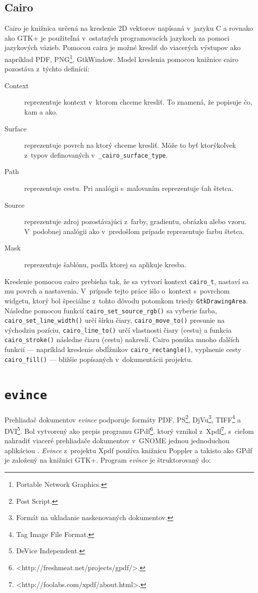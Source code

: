 \documentclass[12pt,oneside,final]{fithesis2}
\begin{document}
\section{Cairo}
Cairo je knižnica určená na kreslenie 2D vektorov napísaná v~jazyku C a rovnako ako GTK+ je použiteľná v~ostatných programovacích jazykoch za pomoci jazykových väzieb. Pomocou caira je možné kresliť do viacerých výstupov ako napríklad PDF, PNG\footnote{Portable Network Graphics.}, GtkWindow. Model kreslenia pomocou knižnice cairo pozostáva z~týchto definícií:
\begin{description}
\item[Context] reprezentuje kontext v~ktorom chceme kresliť. To znamená, že popisuje čo, kam a ako.
\item[Surface] reprezentuje povrch na ktorý chceme kresliť. Môže to byť ktorýkoľvek z~typov definovaných v~\texttt{\_cairo\_surface\_type}.
\item[Path] reprezentuje cestu. Pri analógii s~maľovaním reprezentuje ťah štetca.
\item[Source] reprezentuje zdroj pozostávajúci z~farby, gradientu, obrázku alebo vzoru. V~podobnej analógii ako v~predošlom prípade reprezentuje farbu štetca.
\item[Mask] reprezentuje šablónu, podľa ktorej sa aplikuje kresba.
\end{description}
Kreslenie pomocou cairo prebieha tak, že sa vytvorí kontext \texttt{cairo\_t}, nastaví sa mu povrch a nastavenia. V~prípade tejto práce išlo o~kontext s~povrchom widgetu, ktorý bol špeciálne z~tohto dôvodu potomkom triedy \texttt{GtkDrawingArea}. Následne pomocou funkcií \texttt{cairo\_set\_source\_rgb()} sa vyberie farba, \texttt{cairo\_set\_line\_width()} určí šírku čiary, \texttt{cairo\_move\_to()} presunie na východziu pozíciu, \texttt{cairo\_line\_to()} určí vlastnosti čiary (cestu) a funkcia \texttt{cairo\_stroke()} následne čiaru (cestu) nakreslí. Cairo ponúka mnoho ďalších funkcií --- napríklad kreslenie obdĺžnikov \texttt{cairo\_rectangle()}, vyplnenie cesty \texttt{cairo\_fill()} --- bližšie popísaných v~dokumentácii projektu\cite{cairodoc}.
\chapter{\texttt{evince}}
Prehliadač dokumentov \emph{evince} podporuje formáty PDF, PS\footnote{Post Script.}, DjVu\footnote{Formát na ukladanie naskenovaných dokumentov.}, TIFF\footnote{Tag Image File Format.} a DVI\footnote{DeVice Independent.}. Bol vytvorený ako prepis programu GPdf\footnote{<http://freshmeat.net/projects/gpdf/>.}, ktorý vznikol z~Xpdf\footnote{<http://foolabs.com/xpdf/about.html>.}, s~cieľom nahradiť viaceré prehliadače dokumentov v~GNOME jednou jednoduchou aplikáciou \cite{evince}. \emph{Evince} z~projektu Xpdf používa knižnicu Poppler a takisto ako GPdf je založený na knižnici GTK+. Program \emph{evince} je štruktorovaný do:
\end{document}
